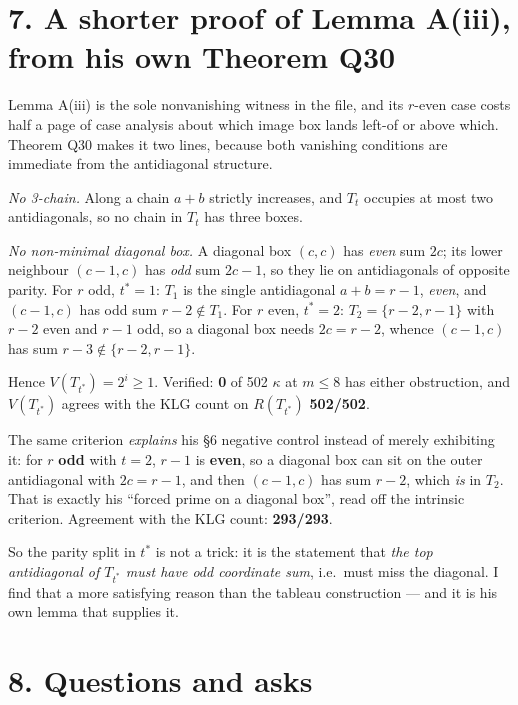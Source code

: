 \documentclass[11pt,a4paper]{article}
\theoremstyle{remark}
\begin{document}
\section*{7. A shorter proof of Lemma A(iii), from his own Theorem Q30}

Lemma A(iii) is the sole nonvanishing witness in the file, and its $r$-even case costs half a
page of case analysis about which image box lands left-of or above which. Theorem Q30 makes it
two lines, because both vanishing conditions are immediate from the antidiagonal structure.

\emph{No 3-chain.} Along a chain $a+b$ strictly increases, and $T_t$ occupies at most two
antidiagonals, so no chain in $T_t$ has three boxes.

\emph{No non-minimal diagonal box.} A diagonal box $(c,c)$ has \emph{even} sum $2c$; its lower
neighbour $(c-1,c)$ has \emph{odd} sum $2c-1$, so they lie on antidiagonals of opposite parity.
For $r$ odd, $t^*=1$: $T_1$ is the single antidiagonal $a+b=r-1$, \emph{even}, and $(c-1,c)$ has
odd sum $r-2\notin T_1$. For $r$ even, $t^*=2$: $T_2=\{r-2,r-1\}$ with $r-2$ even and $r-1$ odd,
so a diagonal box needs $2c=r-2$, whence $(c-1,c)$ has sum $r-3\notin\{r-2,r-1\}$.

Hence $V(T_{t^*})=2^i\ge1$. Verified: \textbf{0} of 502 $\kappa$ at $m\le8$ has either
obstruction, and $V(T_{t^*})$ agrees with the KLG count on $R(T_{t^*})$ \textbf{502/502}.

The same criterion \emph{explains} his \S6 negative control instead of merely exhibiting it: for
$r$ \textbf{odd} with $t=2$, $r-1$ is \textbf{even}, so a diagonal box can sit on the outer
antidiagonal with $2c=r-1$, and then $(c-1,c)$ has sum $r-2$, which \emph{is} in $T_2$. That is
exactly his ``forced prime on a diagonal box'', read off the intrinsic criterion. Agreement with
the KLG count: \textbf{293/293}.

So the parity split in $t^*$ is not a trick: it is the statement that \emph{the top antidiagonal
of $T_{t^*}$ must have odd coordinate sum}, i.e.\ must miss the diagonal. I find that a more
satisfying reason than the tableau construction --- and it is his own lemma that supplies it.

\section*{8. Questions and asks}
\end{document}

